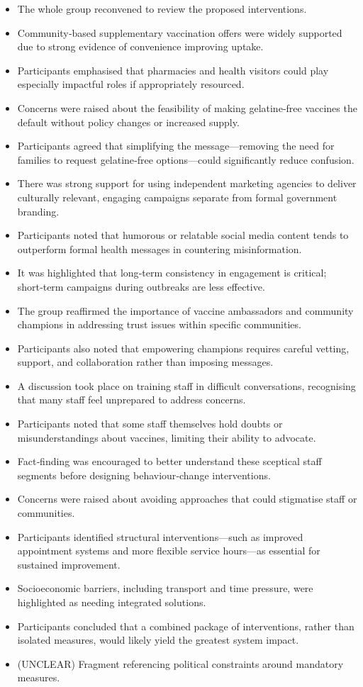 \documentclass{article}
\begin{document}
\begin{itemize}
    \item The whole group reconvened to review the proposed interventions.
    \item Community‑based supplementary vaccination offers were widely supported due to strong evidence of convenience improving uptake.
    \item Participants emphasised that pharmacies and health visitors could play especially impactful roles if appropriately resourced.
    \item  Concerns were raised about the feasibility of making gelatine‑free vaccines the default without policy changes or increased supply.
    \item Participants agreed that simplifying the message—removing the need for families to request gelatine‑free options—could significantly reduce confusion.
    \item There was strong support for using independent marketing agencies to deliver culturally relevant, engaging campaigns separate from formal government branding.
    \item Participants noted that humorous or relatable social media content tends to outperform formal health messages in countering misinformation.
    \item It was highlighted that long‑term consistency in engagement is critical; short‑term campaigns during outbreaks are less effective.
    \item The group reaffirmed the importance of vaccine ambassadors and community champions in addressing trust issues within specific communities.
    \item Participants also noted that empowering champions requires careful vetting, support, and collaboration rather than imposing messages.
    \item A discussion took place on training staff in difficult conversations, recognising that many staff feel unprepared to address concerns.
    \item Participants noted that some staff themselves hold doubts or misunderstandings about vaccines, limiting their ability to advocate.
    \item Fact‑finding was encouraged to better understand these sceptical staff segments before designing behaviour‑change interventions.
    \item Concerns were raised about avoiding approaches that could stigmatise staff or communities.
    \item Participants identified structural interventions—such as improved appointment systems and more flexible service hours—as essential for sustained improvement.
    \item Socioeconomic barriers, including transport and time pressure, were highlighted as needing integrated solutions.
    \item Participants concluded that a combined package of interventions, rather than isolated measures, would likely yield the greatest system impact.
    \item (UNCLEAR) Fragment referencing political constraints around mandatory measures.
\end{itemize}
\end{document}
